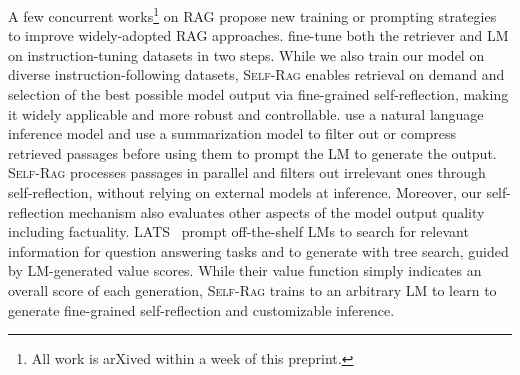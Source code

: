 \documentclass{article} %
\newcommand{\model}{\textsc{Self-Rag}\xspace}
\begin{document}
{
A few concurrent works\footnote{All work is arXived within a week of this preprint.} on RAG propose new training or prompting strategies to improve widely-adopted RAG approaches. 
\cite{lin2023radit} fine-tune both the retriever and LM on instruction-tuning datasets in two steps.
While we also train our model on diverse instruction-following datasets, \model enables retrieval on demand and selection of the best possible model output via fine-grained self-reflection, making it widely applicable and more robust and controllable. 
\citet{Yoran2023MakingRL} use a natural language inference model and \citet{xu2023recomp} use a summarization model to filter out or compress retrieved passages before using them to prompt the LM to generate the output.
\model processes passages in parallel and filters out irrelevant ones through self-reflection, without relying on external models at inference. Moreover, our self-reflection mechanism also evaluates other aspects of the model output quality including factuality.
LATS~\citep{zhou2023language} prompt off-the-shelf LMs to search for relevant information for question answering tasks and to generate with tree search, guided by LM-generated value scores. 
While their value function simply indicates an overall score of each generation, \model trains to an arbitrary LM to learn to generate fine-grained self-reflection and customizable inference. 
}

\end{document}
